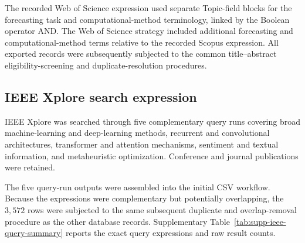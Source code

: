 \documentclass[12pt]{article}
\numberwithin{equation}{section}
\begin{document}
The recorded Web of Science expression used separate Topic-field blocks
for the forecasting task and computational-method terminology, linked by
the Boolean operator AND. The Web of Science strategy included additional
forecasting and computational-method terms relative to the recorded Scopus
expression. All exported records were subsequently subjected to the common
title--abstract eligibility-screening and duplicate-resolution procedures.

\subsection{IEEE Xplore search expression}
\label{sec:supp-ieee-query}


IEEE Xplore was searched through five complementary query runs covering
broad machine-learning and deep-learning methods, recurrent and
convolutional architectures, transformer and attention mechanisms,
sentiment and textual information, and metaheuristic optimization.
Conference and journal publications were retained.

The five query-run outputs were assembled into the initial CSV workflow.
Because the expressions were complementary but potentially overlapping,
the \(3{,}572\) rows were subjected to the same subsequent duplicate
and overlap-removal procedure as the other database records.
Supplementary Table~\ref{tab:supp-ieee-query-summary} reports the exact
query expressions and raw result counts.
\end{document}
